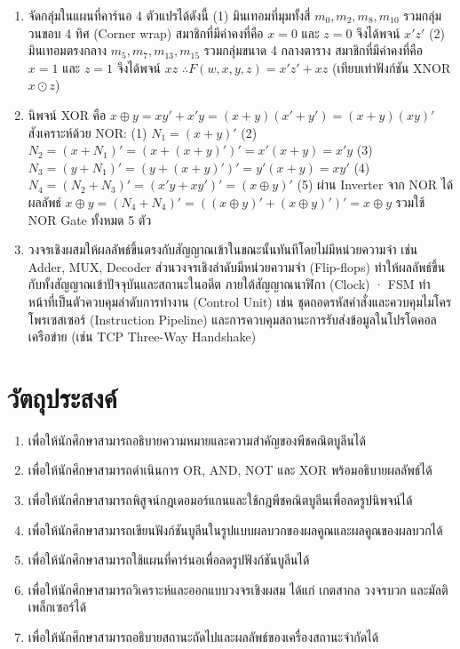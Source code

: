 \begin{enumerate}
    \item จัดกลุ่มในแผนที่คาร์นอ 4 ตัวแปรได้ดังนี้ (1) มินเทอมที่มุมทั้งสี่ $m_0, m_2, m_8, m_{10}$ รวมกลุ่มวนขอบ 4 ทิศ (Corner wrap) สมาชิกที่มีค่าคงที่คือ $x=0$ และ $z=0$ จึงได้พจน์ $x'z'$ (2) มินเทอมตรงกลาง $m_5, m_7, m_{13}, m_{15}$ รวมกลุ่มขนาด 4 กลางตาราง สมาชิกที่มีค่าคงที่คือ $x=1$ และ $z=1$ จึงได้พจน์ $xz$ $\therefore F(w, x, y, z) = x'z' + xz$ (เทียบเท่าฟังก์ชัน XNOR $x \odot z$)

    \item นิพจน์ XOR คือ $x \oplus y = xy' + x'y = (x + y)(x' + y') = (x + y)(xy)'$ สังเคราะห์ด้วย NOR: (1) $N_1 = (x + y)'$ (2) $N_2 = (x + N_1)' = (x + (x+y)')' = x'(x+y) = x'y$ (3) $N_3 = (y + N_1)' = (y + (x+y)')' = y'(x+y) = xy'$ (4) $N_4 = (N_2 + N_3)' = (x'y + xy')' = (x \oplus y)'$ (5) ผ่าน Inverter จาก NOR ได้ผลลัพธ์ $x \oplus y = (N_4 + N_4)' = ((x \oplus y)' + (x \oplus y)')' = x \oplus y$ รวมใช้ NOR Gate ทั้งหมด 5 ตัว

    \item วงจรเชิงผสมให้ผลลัพธ์ขึ้นตรงกับสัญญาณเข้าในขณะนั้นทันทีโดยไม่มีหน่วยความจำ เช่น Adder, MUX, Decoder ส่วนวงจรเชิงลำดับมีหน่วยความจำ (Flip-flops) ทำให้ผลลัพธ์ขึ้นกับทั้งสัญญาณเข้าปัจจุบันและสถานะในอดีต ภายใต้สัญญาณนาฬิกา (Clock) · FSM ทำหน้าที่เป็นตัวควบคุมลำดับการทำงาน (Control Unit) เช่น ชุดถอดรหัสคำสั่งและควบคุมไมโครโพรเซสเซอร์ (Instruction Pipeline) และการควบคุมสถานะการรับส่งข้อมูลในโปรโตคอลเครือข่าย (เช่น TCP Three-Way Handshake)
\end{enumerate}

\newpage
{}
\section*{วัตถุประสงค์}
\begin{enumerate}
    \item เพื่อให้นักศึกษาสามารถอธิบายความหมายและความสำคัญของพีชคณิตบูลีนได้
    \item เพื่อให้นักศึกษาสามารถดำเนินการ OR, AND, NOT และ XOR พร้อมอธิบายผลลัพธ์ได้
    \item เพื่อให้นักศึกษาสามารถพิสูจน์กฎเดอมอร์แกนและใช้กฎพีชคณิตบูลีนเพื่อลดรูปนิพจน์ได้
    \item เพื่อให้นักศึกษาสามารถเขียนฟังก์ชันบูลีนในรูปแบบผลบวกของผลคูณและผลคูณของผลบวกได้
    \item เพื่อให้นักศึกษาสามารถใช้แผนที่คาร์นอเพื่อลดรูปฟังก์ชันบูลีนได้
    \item เพื่อให้นักศึกษาสามารถวิเคราะห์และออกแบบวงจรเชิงผสม ได้แก่ เกตสากล วงจรบวก และมัลติเพล็กเซอร์ได้
    \item เพื่อให้นักศึกษาสามารถอธิบายสถานะถัดไปและผลลัพธ์ของเครื่องสถานะจำกัดได้
\end{enumerate}
